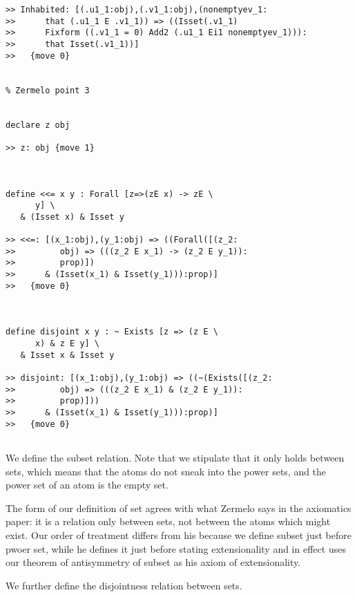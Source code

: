 \documentclass[12pt]{article}
\begin{document}
\begin{verbatim}
>> Inhabited: [(.u1_1:obj),(.v1_1:obj),(nonemptyev_1:
>>      that (.u1_1 E .v1_1)) => ((Isset(.v1_1)
>>      Fixform ((.v1_1 = 0) Add2 (.u1_1 Ei1 nonemptyev_1))):
>>      that Isset(.v1_1))]
>>   {move 0}


% Zermelo point 3


declare z obj

>> z: obj {move 1}



define <<= x y : Forall [z=>(zE x) -> zE \
      y] \
   & (Isset x) & Isset y

>> <<=: [(x_1:obj),(y_1:obj) => ((Forall([(z_2:
>>         obj) => (((z_2 E x_1) -> (z_2 E y_1)):
>>         prop)])
>>      & (Isset(x_1) & Isset(y_1))):prop)]
>>   {move 0}



define disjoint x y : ~ Exists [z => (z E \
      x) & z E y] \
   & Isset x & Isset y

>> disjoint: [(x_1:obj),(y_1:obj) => ((~(Exists([(z_2:
>>         obj) => (((z_2 E x_1) & (z_2 E y_1)):
>>         prop)]))
>>      & (Isset(x_1) & Isset(y_1))):prop)]
>>   {move 0}


\end{verbatim}

We define the subset relation.  Note that we stipulate that it only holds between sets, which means that the atoms do not sneak into the power sets,
and the power set of an atom is the empty set.

The form of our definition of set agrees with what Zermelo says in the axiomatics paper:  it is a relation only between sets, not between the atoms which might exist.  Our order of treatment differs from his because we define subset just before pwoer set, while he defines it just before stating extensionality and in effect uses our theorem of antisymmetry of subset as
his axiom of extensionality.

We further define the disjointness relation between sets.
\end{document}
